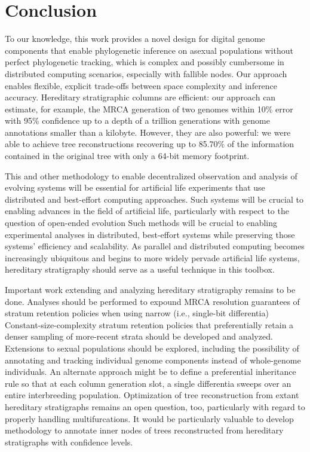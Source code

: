 \section{Conclusion} \label{sec:conclusion}

To our knowledge, this work provides a novel design for digital genome components that enable phylogenetic inference on asexual populations without perfect phylogenetic tracking, which is complex and possibly cumbersome in distributed computing scenarios, especially with fallible nodes.
Our approach enables flexible, explicit trade-offs between space complexity and inference accuracy.
Hereditary stratigraphic columns are efficient: our approach can estimate, for example, the MRCA generation of two genomes within 10\% error with 95\% confidence up to a depth of a trillion generations with genome annotations smaller than a kilobyte.
However, they are also powerful: we were able to achieve tree reconstructions recovering up to 85.70\% of the information contained in the original tree with only a 64-bit memory footprint.

This and other methodology to enable decentralized observation and analysis of evolving systems will be essential for artificial life experiments that use distributed and best-effort computing approaches.
Such systems will be crucial to enabling advances in the field of artificial life, particularly with respect to the question of open-ended evolution \citep{ackley2011pursue,moreno2021conduit,moreno2021case}
Such methods will be crucial to enabling experimental analyses in distributed, best-effort systems while preserving those systems' efficiency and scalability.
As parallel and distributed computing becomes increasingly ubiquitous and begins to more widely pervade artificial life systems, hereditary stratigraphy should serve as a useful technique in this toolbox.

Important work extending and analyzing hereditary stratigraphy remains to be done.
Analyses should be performed to expound MRCA resolution guarantees of stratum retention policies when using narrow (i.e., single-bit differentia)
Constant-size-complexity stratum retention policies that preferentially retain a denser sampling of more-recent strata should be developed and analyzed.
Extensions to sexual populations should be explored, including the possibility of annotating and tracking individual genome components instead of whole-genome individuals.
An alternate approach might be to define a preferential inheritance rule so that at each column generation slot, a single differentia sweeps over an entire interbreeding population.
Optimization of tree reconstruction from extant hereditary stratigraphs remains an open question, too, particularly with regard to properly handling multifurcations.
It would be particularly valuable to develop methodology to annotate inner nodes of trees reconstructed from hereditary stratigraphs with confidence levels.

